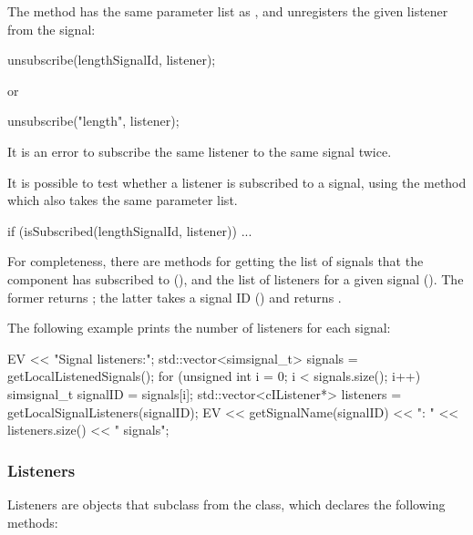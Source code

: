 The  method has the same parameter list
as , and unregisters the given listener
from the signal:

\begin{cpp}
unsubscribe(lengthSignalId, listener);
\end{cpp}

or

\begin{cpp}
unsubscribe("length", listener);
\end{cpp}

It is an error to subscribe the same listener to the same
signal twice.

It is possible to test whether a listener is subscribed to a signal,
using the  method which also takes the same
parameter list.

\begin{cpp}
if (isSubscribed(lengthSignalId, listener)) {
    ...
}
\end{cpp}

For completeness, there are methods for getting the list of signals
that the component has subscribed to (),
and the list of listeners for a given signal ().
The former returns ; the latter takes
a signal ID () and returns .

The following example prints the number of listeners for each signal:

\begin{cpp}
EV << "Signal listeners:\n";
std::vector<simsignal_t> signals = getLocalListenedSignals();
for (unsigned int i = 0; i < signals.size(); i++) {
    simsignal_t signalID = signals[i];
    std::vector<cIListener*> listeners = getLocalSignalListeners(signalID);
    EV << getSignalName(signalID) << ": " << listeners.size() << " signals\n";
}
\end{cpp}

\subsubsection{Listeners}
\label{sec:simple-modules:signal-listeners}

Listeners are objects that subclass from the  class, which
declares the following methods:

